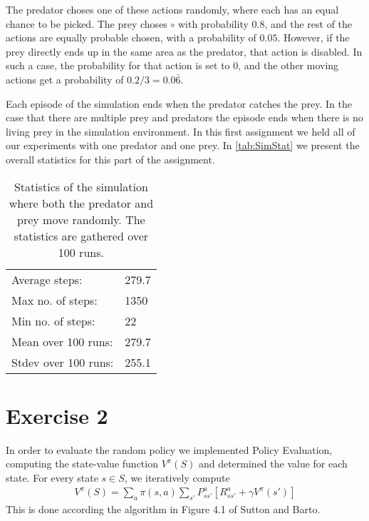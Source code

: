\documentclass[a4paper,11pt]{article}
\begin{document}
The predator choses one of these actions randomly, where each has an equal chance to be picked.  The prey choses $\circ$ with probability $0.8$, and the rest of the actions are equally probable chosen, with a probability of $0.05$.  However, if the prey directly ends up in the same area as the predator, that action is disabled.  In such a case, the probability for that action is set to $0$, and the other moving actions get a probability of $0.2 / 3 = 0.0\bar{6}$.

Each episode of the simulation ends when the predator catches the prey.  In the case that there are multiple prey and predators the episode ends when there is no living prey in the simulation environment.  In this first assignment we held all of our experiments with one predator and one prey.  In \autoref{tab:SimStat} we present the overall statistics for this part of the assignment.

\begin{table}[h!]
\caption{Statistics of the simulation where both the predator and prey move randomly.  The statistics are gathered over 100 runs.}
\label{tab:SimStat}
\begin{center}
\begin{small}
\begin{tabular}{|@{ }l@{ }@{ }l@{ }}
      Average steps: & 279.7 \\ 
      Max no. of steps: & 1350   \\ 
      Min no. of steps: & 22 \\ 
      Mean over 100 runs: & 279.7  \\ 
      Stdev over 100 runs: & 255.1 \\
    \end{tabular}      
\end{small}
\end{center}  
\end{table}

\section*{Exercise 2}
In order to evaluate the random policy we implemented Policy Evaluation, computing the state-value function $V^\pi(S)$ and determined the value for each state.  For every state $s \in S$, we iteratively compute
\begin{align*}
V^\pi{(S)} = \sum_{a}\pi(s,a)\sum_{s'}P_{ss'}^a[R_{ss'}^a + \gamma V^{\pi}(s')]
\end{align*}
This is done according the algorithm in Figure 4.1 of Sutton and Barto.
\end{document}
